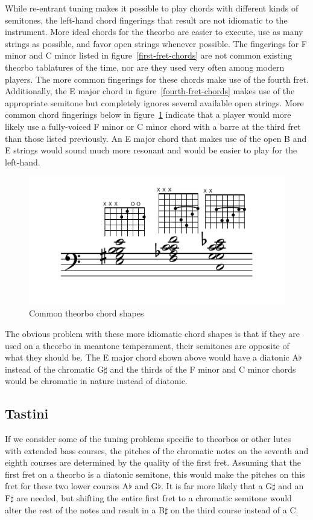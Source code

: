 While re-entrant tuning makes it possible to play chords with different kinds of
semitones, the left-hand chord fingerings that result are not idiomatic to the instrument.
More ideal chords for the theorbo are easier to execute, use as many strings as possible,
and favor open strings whenever possible.  The fingerings for F minor and C minor listed
in figure~\ref{first-fret-chords} are not common existing theorbo tablatures of the time, nor are
they used very often among modern players. The more common fingerings for these chords
make use of the fourth fret.  Additionally, the E major chord in figure~\ref{fourth-fret-chords}
makes use of the appropriate semitone but completely ignores several available open
strings.  More common chord fingerings below in figure~\ref{common-chords} indicate that a player
would more likely use a fully-voiced F minor or C minor chord with a barre at the third
fret than those listed previously.  An E major chord that makes use of the open B and
E strings would sound much more resonant and would be easier to play for the left-hand.
\begin{figure}[h]
\centering
\includegraphics{examples/common-chords.pdf}
\caption{Common theorbo chord shapes}
\label{common-chords}
\end{figure}
The obvious problem with these more idiomatic chord shapes is that if they are used on
a theorbo in meantone temperament, their semitones are opposite of what they should be.
The E major chord shown above would have a diatonic A$\flat$ instead of the chromatic
G$\sharp$ and the thirds of the F minor and C minor chords would be chromatic in nature
instead of diatonic.

\subsection{Tastini}

If we consider some of the tuning problems specific to theorbos or other lutes with
extended bass courses,
the pitches of the chromatic notes on the seventh and eighth courses are determined by the
quality of the first fret.  Assuming that the first fret on a theorbo is a diatonic
semitone, this would make the pitches on this fret for these two lower courses A$\flat$
and G$\flat$.  It is far more likely that a G$\sharp$ and an F$\sharp$ are needed, but
shifting the entire first fret to a chromatic semitone would alter the rest of the notes
and result in a B$\sharp$ on the third course instead of a C.

